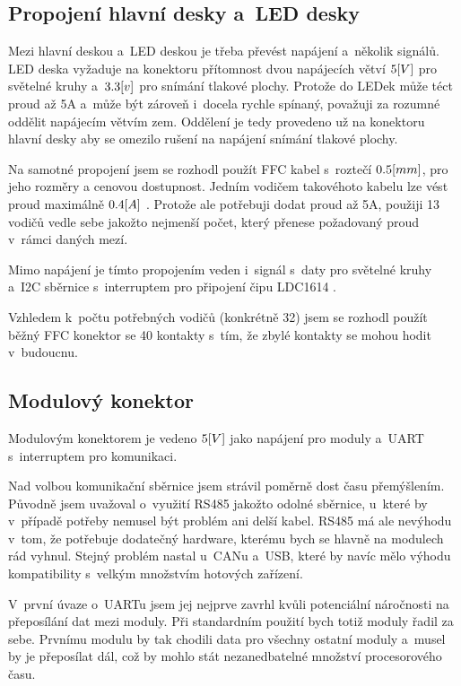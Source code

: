 \subsection{Propojení hlavní desky a~LED desky}
Mezi hlavní deskou a~LED deskou je třeba převést napájení a~několik signálů.
LED deska vyžaduje na konektoru přítomnost dvou napájecích větví \(5\-[V]\) pro světelné kruhy a~\(3.3\-[v]\) pro snímání tlakové plochy.
Protože do LEDek může téct proud až 5A a~může být zároveň i~docela rychle spínaný, považuji za rozumné oddělit napájecím větvím zem.
Oddělení je tedy provedeno už na konektoru hlavní desky aby se omezilo rušení na napájení snímání tlakové plochy.

Na samotné propojení jsem se rozhodl použít FFC kabel s~roztečí \(0.5\-[mm]\), pro jeho rozměry a cenovou dostupnost.
Jedním vodičem takovéhoto kabelu lze vést proud maximálně \(0.4\-[A]\) \cite{FFC-konektor}.
Protože ale potřebuji dodat proud až 5A, použiji 13 vodičů vedle sebe jakožto nejmenší počet, který přenese požadovaný proud v~rámci daných mezí.

Mimo napájení je tímto propojením veden i~signál s~daty pro světelné kruhy a~I2C sběrnice s~interruptem pro připojení čipu LDC1614 \cite{LDC1614}.

Vzhledem k~počtu potřebných vodičů (konkrétně 32) jsem se rozhodl použít běžný FFC konektor se 40 kontakty s~tím, že zbylé kontakty se mohou hodit v~budoucnu.

\subsection{Modulový konektor \label{sec:ModulovyKonektor}}
Modulovým konektorem je vedeno \(5\-[V]\) jako napájení pro moduly a~UART s~interruptem pro komunikaci.

Nad volbou komunikační sběrnice jsem strávil poměrně dost času přemýšlením.
Původně jsem uvažoval o~využití RS485 jakožto odolné sběrnice, u~které by v~případě potřeby nemusel být problém ani delší kabel.
RS485 má ale nevýhodu v~tom, že potřebuje dodatečný hardware, kterému bych se hlavně na modulech rád vyhnul.
Stejný problém nastal u~CANu a~USB, které by navíc mělo výhodu kompatibility s~velkým množstvím hotových zařízení.

V~první úvaze o~UARTu jsem jej nejprve zavrhl kvůli potenciální náročnosti na přeposílání dat mezi moduly.
Při standardním použití bych totiž moduly řadil za sebe.
Prvnímu modulu by tak chodili data pro všechny ostatní moduly a~musel by je přeposílat dál, což by mohlo stát nezanedbatelné množství procesorového času.

